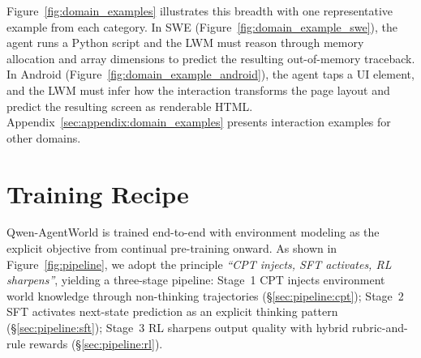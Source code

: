 \documentclass{llmxive}
\providecommand{\method}{Qwen-AgentWorld\xspace}
\begin{document}
\begin{table}[!ht]
\centering
\small
{}
\caption{The seven domains covered by \method, with their action, observation, and core capability exercised by next-state prediction.}
\label{tab:domain_taxonomy}
\end{table}

Figure~\ref{fig:domain_examples} illustrates this breadth with one representative example from each category.
In SWE (Figure~\ref{fig:domain_example_swe}), the agent runs a Python script and the LWM must reason through memory allocation and array dimensions to predict the resulting out-of-memory traceback.
In Android (Figure~\ref{fig:domain_example_android}), the agent taps a UI element, and the LWM must infer how the interaction transforms the page layout and predict the resulting screen as renderable HTML.
Appendix~\ref{sec:appendix:domain_examples} presents interaction examples for other domains.


\section{Training Recipe}
\label{sec:pipeline}

\method is trained end-to-end with environment modeling as the explicit objective from continual pre-training onward.
As shown in Figure~\ref{fig:pipeline}, we adopt the principle \emph{``CPT injects, SFT activates, RL sharpens''}, yielding a three-stage pipeline: Stage~1 CPT injects environment world knowledge through non-thinking trajectories (\S\ref{sec:pipeline:cpt}); Stage~2 SFT activates next-state prediction as an explicit thinking pattern (\S\ref{sec:pipeline:sft}); Stage~3 RL sharpens output quality with hybrid rubric-and-rule rewards (\S\ref{sec:pipeline:rl}).
\end{document}
